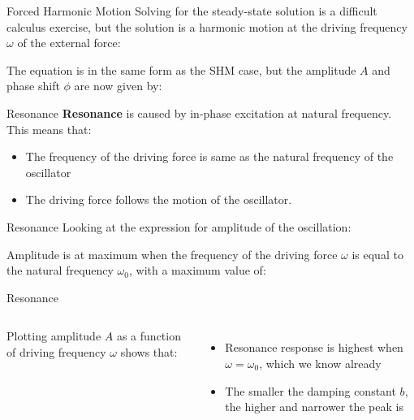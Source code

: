 \documentclass[12pt,compress,aspectratio=169]{beamer}
\begin{document}
\begin{frame}{Forced Harmonic Motion}
  Solving for the steady-state solution is a difficult calculus exercise, but
  the solution is a harmonic motion at the driving frequency $\omega$ of the
  external force:

  
  The equation is in the same form as the SHM case, but the amplitude $A$ and
  phase shift $\phi$ are now given by:

\end{frame}



\begin{frame}{Resonance}
  \textbf{Resonance} is caused by in-phase excitation at natural frequency.
  This means that:
  \begin{itemize}
  \item The frequency of the driving force is same as the natural frequency of
    the oscillator

  \item The driving force follows the motion of the oscillator.
  \end{itemize}
\end{frame}



\begin{frame}{Resonance}
  Looking at the expression for amplitude of the oscillation:
  
  
  Amplitude is at maximum when the frequency of the driving force $\omega$ is
  equal to the natural frequency $\omega_0$, with a maximum value of:
  
\end{frame}



\begin{frame}{Resonance}
  \begin{columns}
    
    Plotting amplitude $A$ as a function of driving frequency $\omega$ shows
    that:
    \begin{itemize}
    \item Resonance response is highest when $\omega=\omega_0$, which we know
      already
    \item The smaller the damping constant $b$, the higher and narrower the
      peak is
    \end{itemize}
  \end{columns}
\end{frame}
\end{document}
